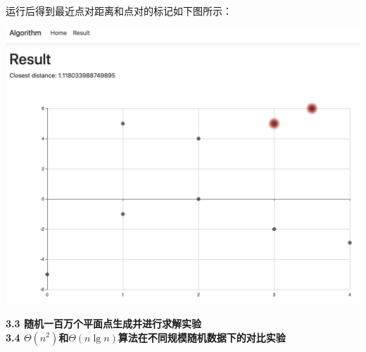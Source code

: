 \documentclass[a4paper]{article}
\begin{document}
\begin{enumerate}
  运行后得到最近点对距离和点对的标记如下图所示：
  \bigskip
  \begin{center}
    \includegraphics[scale=0.3]{Pictures/cpop2.png}
  \end{center}
  \medskip
  \textbf{3.3 随机一百万个平面点生成并进行求解实验}\\
  \medskip
  \textbf{3.4 $\Theta(n^2)$和$\Theta(n\lg n)$算法在不同规模随机数据下的对比实验}
  \\
\end{enumerate}
\end{document}
